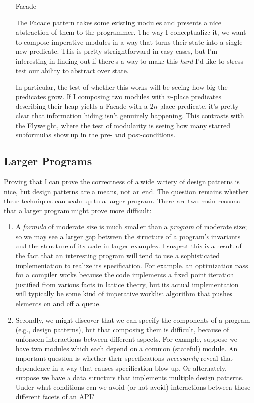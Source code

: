 \begin{itemize}
\item[Facade]

The Facade pattern takes some existing modules and presents a nice
abstraction of them to the programmer. The way I conceptualize it, we
want to compose imperative modules in a way that turns their state
into a single new predicate. This is pretty straightforward in easy
cases, but I'm interesting in finding out if there's a way to make
this \emph{hard} I'd like to stress-test our ability to abstract over
state.

In particular, the test of whether this works will be seeing how big
the predicates grow. If I composing two modules with $n$-place
predicates describing their heap yields a Facade with a $2n$-place
predicate, it's pretty clear that information hiding isn't genuinely
happening. This contrasts with the Flyweight, where the test of
modularity is seeing how many starred subformulas show up in the
pre- and post-conditions. 

\end{itemize}

\subsection{Larger Programs}

Proving that I can prove the correctness of a wide variety of design
patterns is nice, but design patterns are a means, not an end. The
question remains whether these techniques can scale up to a larger
program. There are two main reasons that a larger program might prove
more difficult:

\begin{enumerate}
\item A \emph{formula} of moderate size is much smaller than a 
\emph{program} of moderate size; so we may see a larger gap between 
the structure of a program's invariants and the structure of its code
in larger examples. I suspect this is a result of the fact that an
interesting program will tend to use a sophisticated implementation to
realize its specification. For example, an optimization pass for a
compiler works because the code implements a fixed point iteration
justified from various facts in lattice theory, but its actual
implementation will typically be some kind of imperative worklist
algorithm that pushes elements on and off a queue.

\item Secondly, we might discover that we can specify the components
of a program (e.g., design patterns), but that composing them is
difficult, because of unforseen interactions between different
aspects. For example, suppose we have two modules which each depend on
a common (stateful) module. An important question is whether their
specifications \emph{necessarily} reveal that dependence in a way that
causes specification blow-up. Or alternately, suppose we have a data
structure that implements multiple design patterns. Under what
conditions can we avoid (or not avoid) interactions between those
different facets of an API?
\end{enumerate}

